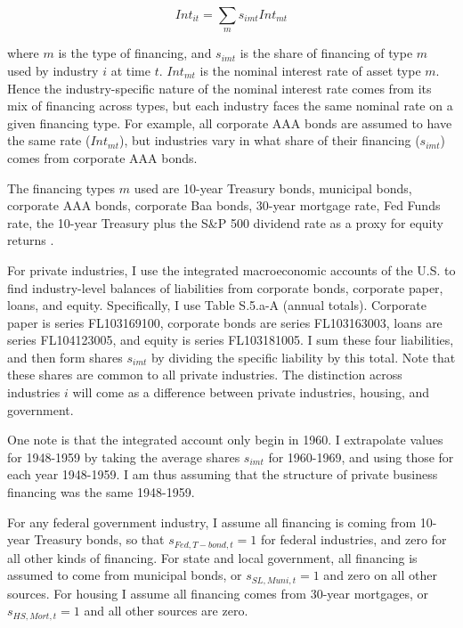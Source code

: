 \documentclass[11pt]{article}
\begin{document}
\begin{equation}
    Int_{it} = \sum_m s_{imt} Int_{mt}
\end{equation} 

where $m$ is the type of financing, and $s_{imt}$ is the share of financing of type $m$ used by industry $i$ at time $t$. $Int_{mt}$ is the nominal interest rate of asset type $m$. Hence the industry-specific nature of the nominal interest rate comes from its mix of financing across types, but each industry faces the same nominal rate on a given financing type. For example, all corporate AAA bonds are assumed to have the same rate ($Int_{mt}$), but industries vary in what share of their financing ($s_{imt}$) comes from corporate AAA bonds. 

The financing types $m$ used are 10-year Treasury bonds, municipal bonds, corporate AAA bonds, corporate Baa bonds, 30-year mortgage rate, Fed Funds rate, the 10-year Treasury plus the S\&P 500 dividend rate as a proxy for equity returns \citep{fedint,fredmort,moodys}.

For private industries, I use the integrated macroeconomic accounts of the U.S. \citep{beaimap} to find industry-level balances of liabilities from corporate bonds, corporate paper, loans, and equity. Specifically, I use Table S.5.a-A (annual totals). Corporate paper is series FL103169100, corporate bonds are series FL103163003, loans are series FL104123005, and equity is series FL103181005. I sum these four liabilities, and then form shares $s_{imt}$ by dividing the specific liability by this total. Note that these shares are common to all private industries. The distinction across industries $i$ will come as a difference between private industries, housing, and government. 

One note is that the integrated account only begin in 1960. I extrapolate values for 1948-1959 by taking the average shares $s_{imt}$ for 1960-1969, and using those for each year 1948-1959. I am thus assuming that the structure of private business financing was the same 1948-1959. 

For any federal government industry, I assume all financing is coming from 10-year Treasury bonds, so that $s_{Fed,T-bond,t} = 1$ for federal industries, and zero for all other kinds of financing. For state and local government, all financing is assumed to come from municipal bonds, or $s_{SL,Muni,t} = 1$ and zero on all other sources. For housing I assume all financing comes from 30-year mortgages, or $s_{HS,Mort,t}=1$ and all other sources are zero. 
\end{document}
